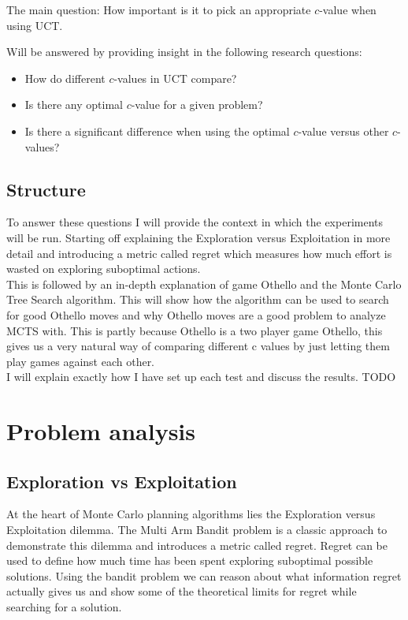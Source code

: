 \documentclass[
11pt, %
english, %
singlespacing, %
headsepline, %
]{MastersDoctoralThesis} %
\begin{document}
The main question: How important is it to pick an appropriate $c$-value when using UCT.

Will be answered by providing insight in the following research questions:
\begin{itemize}
	\item How do different $c$-values in UCT compare?
	\item Is there any optimal $c$-value for a given problem?
	\item Is there a significant difference when using the optimal $c$-value versus other $c$-values?
\end{itemize}
\section{Structure}
To answer these questions I will provide the context in which the experiments will be run. Starting off explaining the Exploration versus Exploitation in more detail and introducing a metric called regret which measures how much effort is wasted on exploring suboptimal actions.\\ This is followed by an in-depth explanation of game Othello and the Monte Carlo Tree Search algorithm. This will show how the algorithm can be used to search for good Othello moves and why Othello moves are a good problem to analyze MCTS with. This is partly because Othello is a two player game Othello, this gives us a very natural way of comparing different c values by just letting them play games against each other.\\
I will explain exactly how I have set up each test and discuss the results. TODO


\chapter{Problem analysis}

\section{Exploration vs Exploitation}
At the heart of Monte Carlo planning algorithms lies the Exploration versus Exploitation dilemma. The Multi Arm Bandit problem is a classic approach to demonstrate this dilemma and introduces a metric called regret. Regret can be used to define how much time has been spent exploring suboptimal possible solutions. Using the bandit problem we can reason about what information regret actually gives us and show some of the theoretical limits for regret while searching for a solution.
\end{document}
